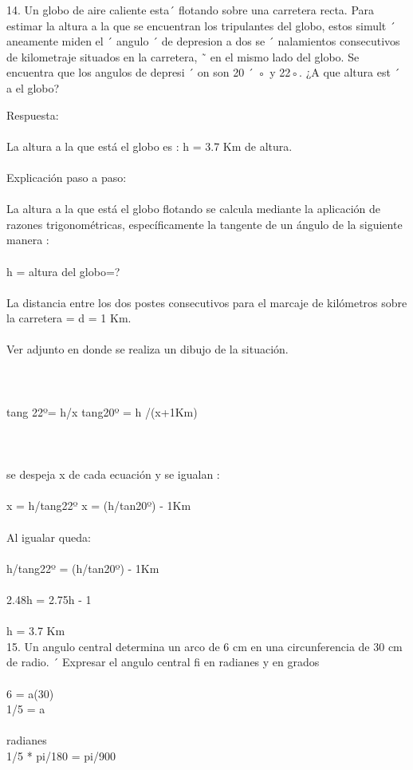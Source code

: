 \documentclass[11pt]{article}
\begin{document}
14. 
Un globo de aire caliente esta´ flotando sobre una carretera recta. Para estimar la altura a
la que se encuentran los tripulantes del globo, estos simult ´ aneamente miden el ´ angulo ´
de depresion a dos se ´ nalamientos consecutivos de kilometraje situados en la carretera, ˜
en el mismo lado del globo. Se encuentra que los angulos de depresi ´ on son 20 ´ ◦ y 22◦.
¿A que altura est ´ a el globo?

Respuesta:\\
\\
La altura a la que está el globo es : h = 3.7 Km de altura.\\
\\
Explicación paso a paso:\\
\\
La altura a la que está el globo flotando se calcula mediante la aplicación de razones trigonométricas, específicamente la tangente de un ángulo de la siguiente manera :\\
\\
h = altura del globo=?\\
\\
La distancia entre los dos postes consecutivos para el marcaje de kilómetros sobre la carretera = d = 1 Km.\\
\\
Ver adjunto en donde se realiza un dibujo de la situación.\\
\\
 \\
\\
tang 22º= h/x         tang20º = h /(x+1Km)\\
\\
 \\
\\
 se despeja x de cada ecuación y se igualan :\\
\\
         x  = h/tang22º              x = (h/tan20º)  - 1Km\\
\\
   Al igualar queda:\\
\\
               h/tang22º = (h/tan20º)  - 1Km\\
\\
               2.48h = 2.75h - 1\\
\\
                     h = 3.7 Km\\

15. Un angulo central determina un arco de 6 cm en una circunferencia de 30 cm de radio. ´
Expresar el angulo central fi en radianes y en grados
\\
\\
6 = a(30)\\
1/5 = a\\
\\
radianes\\
1/5 * pi/180 = pi/900\\
\end{document}
